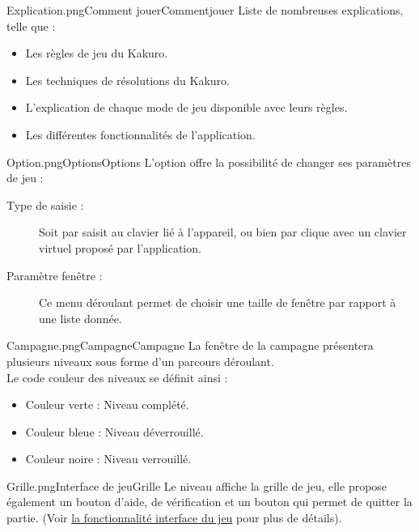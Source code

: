 \begin{maquette}{Explication.png}{Comment jouer}{Commentjouer}
	Liste de nombreuses explications, telle que :
    \begin{itemize}
        \item Les règles de jeu du Kakuro.
        \item Les techniques de résolutions du Kakuro.
        \item L'explication de chaque mode de jeu disponible avec leurs règles.
        \item Les différentes fonctionnalités de l'application.
   \end{itemize}
\end{maquette}

\begin{maquette}{Option.png}{Options}{Options}
	L'option offre la possibilité de changer ses paramètres de jeu :
    \begin{description}
        \item[Type de saisie :] Soit par saisit au clavier lié à l'appareil, ou bien par clique avec un clavier virtuel proposé par l'application.
        \item[Paramètre fenêtre :] Ce menu déroulant permet de choisir une taille de fenêtre par rapport à une liste donnée.
    \end{description}
\end{maquette}

\pagebreak
\begin{maquette}{Campagne.png}{Campagne}{Campagne}
    La fenêtre de la campagne présentera plusieurs niveaux sous forme d'un parcours déroulant.\\
    Le code couleur des niveaux se définit ainsi : 
    \begin{itemize}
        \item Couleur verte : Niveau complété. 
        \item Couleur bleue : Niveau déverrouillé. 
        \item Couleur noire : Niveau verrouillé. 
    \end{itemize}
\end{maquette}

\begin{maquette}{Grille.png}{Interface de jeu}{Grille}
	Le niveau affiche la grille de jeu, elle propose également un bouton d'aide, de vérification et un bouton qui permet de quitter la partie.
    (Voir \hyperref[fonc:interface]{la fonctionnalité interface du jeu} pour plus de détails).
\end{maquette}

